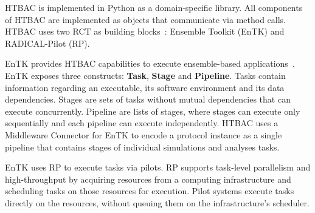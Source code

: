 
HTBAC is implemented in Python as a domain-specific library. All components
of HTBAC are implemented as objects that communicate via method calls. HTBAC
uses two RCT as building blocks~\cite{review_bb_2016}: Ensemble Toolkit
(EnTK) and RADICAL-Pilot (RP).

EnTK provides HTBAC capabilities to execute ensemble-based
applications~\cite{power-of-many17}. EnTK exposes three constructs:
\textbf{Task}, \textbf{Stage} and \textbf{Pipeline}. Tasks contain
information regarding an executable, its software environment and its data
dependencies. Stages are sets of tasks without mutual dependencies that can
execute concurrently. Pipeline are lists of stages, where stages can execute
only sequentially and each pipeline can execute independently. HTBAC uses a
Middleware Connector for EnTK to encode a protocol instance as a single
pipeline that contains stages of individual simulations and analyses tasks.

EnTK uses RP to execute tasks via pilots. RP supports task-level parallelism
and high-throughput by acquiring resources from a computing infrastructure
and scheduling tasks on those resources for execution. Pilot systems execute
tasks directly on the resources, without queuing them on the infrastructure's
scheduler.







